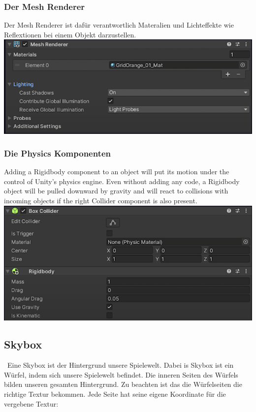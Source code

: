 \subsubsection{Der Mesh Renderer}
Der Mesh Renderer ist dafür verantwortlich Materalien und Lichteffekte wie Reflextionen bei einem Objekt darzustellen.\\
\noindent
\includegraphics[width=0.7\linewidth]{chapters/14/Images/MeshRenderer.png}

\subsubsection{Die Physics Komponenten}
\glqq Adding a Rigidbody component to an object will put its motion under the control of Unity's physics engine. Even without adding any code, a Rigidbody object will be pulled downward by gravity and will react to collisions with incoming objects if the right Collider component is also present. \grqq \cite[][Rigidbody]{unitydocRigidbody} \\
\noindent
\includegraphics[width=0.7\linewidth]{chapters/14/Images/Physics.png}


\pagebreak
{}
\subsection{Skybox}\
Eine Skybox ist der Hintergrund unsere Spielewelt. Dabei is Skybox ist ein Würfel, indem sich unsere Spielewelt befindet. Die inneren Seiten des Würfels bilden unseren gesamten Hintergrund.
Zu beachten ist das die Würfelseiten die richtige Textur bekommen. Jede Seite hat seine eigene Koordinate für die vergebene Textur:\\\\

